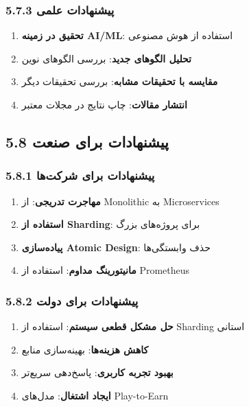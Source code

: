 \documentclass[
]{article}
\providecommand{\tightlist}{%
  \setlength{\itemsep}{0pt}\setlength{\parskip}{0pt}}
\begin{document}
\subsubsection{5.7.3 پیشنهادات
علمی}\label{ux67eux6ccux634ux646ux647ux627ux62fux627ux62a-ux639ux644ux645ux6cc}

\begin{enumerate}
\def\labelenumi{\arabic{enumi}.}
\tightlist
\item
  \textbf{تحقیق در زمینه AI/ML}: استفاده از هوش مصنوعی
\item
  \textbf{تحلیل الگوهای جدید}: بررسی الگوهای نوین
\item
  \textbf{مقایسه با تحقیقات مشابه}: بررسی تحقیقات دیگر
\item
  \textbf{انتشار مقالات}: چاپ نتایج در مجلات معتبر
\end{enumerate}

\subsection{5.8 پیشنهادات برای
صنعت}\label{ux67eux6ccux634ux646ux647ux627ux62fux627ux62a-ux628ux631ux627ux6cc-ux635ux646ux639ux62a}

\subsubsection{5.8.1 پیشنهادات برای
شرکت‌ها}\label{ux67eux6ccux634ux646ux647ux627ux62fux627ux62a-ux628ux631ux627ux6cc-ux634ux631ux6a9ux62aux647ux627}

\begin{enumerate}
\def\labelenumi{\arabic{enumi}.}
\tightlist
\item
  \textbf{مهاجرت تدریجی}: از Monolithic به Microservices
\item
  \textbf{استفاده از Sharding}: برای پروژه‌های بزرگ
\item
  \textbf{پیاده‌سازی Atomic Design}: حذف وابستگی‌ها
\item
  \textbf{مانیتورینگ مداوم}: استفاده از Prometheus
\end{enumerate}

\subsubsection{5.8.2 پیشنهادات برای
دولت}\label{ux67eux6ccux634ux646ux647ux627ux62fux627ux62a-ux628ux631ux627ux6cc-ux62fux648ux644ux62a}

\begin{enumerate}
\def\labelenumi{\arabic{enumi}.}
\tightlist
\item
  \textbf{حل مشکل قطعی سیستم}: استفاده از Sharding استانی
\item
  \textbf{کاهش هزینه‌ها}: بهینه‌سازی منابع
\item
  \textbf{بهبود تجربه کاربری}: پاسخ‌دهی سریع‌تر
\item
  \textbf{ایجاد اشتغال}: مدل‌های Play-to-Earn
\end{enumerate}
\end{document}
